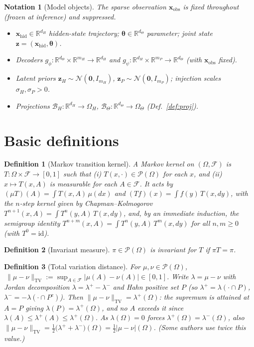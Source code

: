 \documentclass[11pt]{article}
\theoremstyle{definitionbreak}
\newtheorem{definition}{Definition}[section]
\newtheorem{notation}{Notation}[section]
\theoremstyle{plainbreak}
\theoremstyle{remarkbreak}
\newcommand{\R}{\mathbb{R}}
\newcommand{\cF}{\mathcal{F}}
\newcommand{\cP}{\mathcal{P}}
\newcommand{\Om}{\Omega}
\newcommand{\TV}{\mathrm{TV}}
\newcommand{\Normal}{\mathcal{N}}
\newcommand{\xobs}{\bm{x}_{\mathrm{obs}}}
\newcommand{\xhid}{\bm{x}_{\mathrm{hid}}}
\newcommand{\bth}{\bm{\theta}}
\newcommand{\norm}[1]{\lVert #1 \rVert}
\newcommand{\abs}[1]{\lvert #1 \rvert}
\begin{document}
\begin{notation}[Model objects]\leavevmode
The sparse observation $\xobs$ is \emph{fixed} throughout (frozen at inference) and suppressed.
\begin{itemize}
  \item $\xhid\in\R^{d_H}$ hidden-state trajectory; $\bth\in\R^{d_\Theta}$ parameter; joint state
        $\bm z=(\xhid,\bth)$.
  \item Decoders $g_\phi:\R^{d_\Theta}\times\R^{m_H}\to\R^{d_H}$ and
        $g_\psi:\R^{d_H}\times\R^{m_P}\to\R^{d_\Theta}$ (with $\xobs$ fixed).
  \item Latent priors $\bm z_H\sim\Normal(\bm0,I_{m_H})$, $\bm z_P\sim\Normal(\bm0,I_{m_P})$;
        injection scales $\sigma_H,\sigma_P>0$.
  \item Projections $\mathcal B_H:\R^{d_H}\to\Om_H$, $\mathcal B_\Theta:\R^{d_\Theta}\to\Om_\Theta$
        (Def.~\ref{def:proj}).
\end{itemize}
\end{notation}

\section{Basic definitions}
\label{sec:defs}

\begin{definition}[Markov transition kernel]
\label{def:kernel}
A \emph{Markov kernel} on $(\Om,\cF)$ is $T:\Om\times\cF\to[0,1]$ such that (i) $T(x,\cdot)\in\cP(\Om)$
for each $x$, and (ii) $x\mapsto T(x,A)$ is measurable for each $A\in\cF$. It acts by
$(\mu T)(A)=\int T(x,A)\,\mu(dx)$ and $(Tf)(x)=\int f(y)\,T(x,dy)$, with the $n$-step kernel given by
Chapman--Kolmogorov $T^{n+1}(x,A)=\int T^n(y,A)\,T(x,dy)$, and, by an immediate induction, the
semigroup identity $T^{n+m}(x,A)=\int T^n(y,A)\,T^m(x,dy)$ for all $n,m\ge0$ (with $T^0=\mathrm{id}$).
\end{definition}

\begin{definition}[Invariant measure]
\label{def:invariant}
$\pi\in\cP(\Om)$ is \emph{invariant} for $T$ if $\pi T=\pi$.
\end{definition}

\begin{definition}[Total variation distance]
\label{def:tv}
For $\mu,\nu\in\cP(\Om)$, $\ \norm{\mu-\nu}_\TV:=\sup_{A\in\cF}\abs{\mu(A)-\nu(A)}\in[0,1]$.
Write $\lambda=\mu-\nu$ with Jordan decomposition $\lambda=\lambda^+-\lambda^-$ and Hahn positive
set $P$ (so $\lambda^+=\lambda(\cdot\cap P)$, $\lambda^-=-\lambda(\cdot\cap P^c)$). Then
$\norm{\mu-\nu}_\TV=\lambda^+(\Om)$: the supremum is attained at $A=P$ giving
$\lambda(P)=\lambda^+(\Om)$, and no $A$ exceeds it since $\lambda(A)\le\lambda^+(A)\le\lambda^+(\Om)$.
As $\lambda(\Om)=0$ forces $\lambda^+(\Om)=\lambda^-(\Om)$, also
$\norm{\mu-\nu}_\TV=\tfrac12\big(\lambda^++\lambda^-\big)(\Om)=\tfrac12\abs{\mu-\nu}(\Om)$. (Some
authors use twice this value.)
\end{definition}
\end{document}
